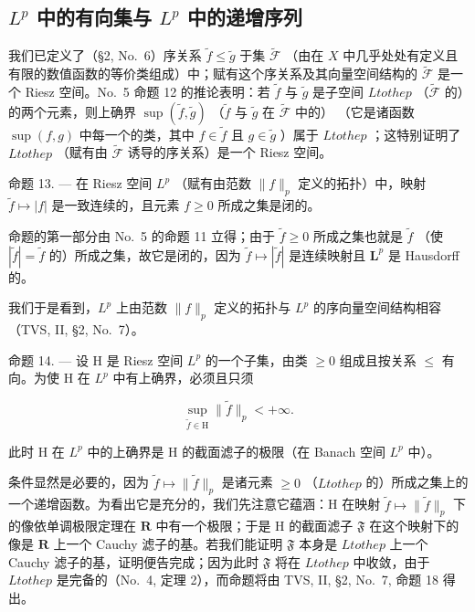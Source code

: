 \subsection{\texorpdfstring{\(L^{p}\) 中的有向集与 \(L^{p}\) 中的递增序列}{L to the p 中的有向集与 L to the p 中的递增序列}}

我们已定义了（§2, No.~6）序关系 \(\widetilde{f} \leqslant \widetilde{g}\) 于集 \(\widetilde{\mathcal{F}}\) （由在 \(X\) 中几乎处处有定义且有限的数值函数的等价类组成）中；赋有这个序关系及其向量空间结构的 \(\widetilde{\mathcal{F}}\) 是一个 Riesz 空间。No.~5 命题 12 的推论表明：若 \(\widetilde{f}\) 与 \(\widetilde{g}\) 是子空间 \(L to the p\) （\(\widetilde{\mathcal{F}}\) 的）的两个元素，则上确界 \(\sup (\widetilde{f}, \widetilde{g})\) （\(\widetilde{f}\) 与 \(\widetilde{g}\) 在 \(\widetilde{\mathcal{F}}\) 中的） （它是诸函数 \(\sup (f, g)\) 中每一个的类，其中 \(f \in \widetilde{f}\) 且 \(g \in \widetilde{g}\) ）属于 \(L to the p\) ；这特别证明了 \(L to the p\) （赋有由 \(\widetilde{\mathcal{F}}\) 诱导的序关系）是一个 Riesz 空间。

命题 13. --- 在 Riesz 空间 \(L^{p}\) （赋有由范数 \(\|f\|_{p}\) 定义的拓扑）中，映射 \(\widetilde{f} \mapsto |f|\) 是一致连续的，且元素 \(f \geqslant 0\) 所成之集是闭的。

命题的第一部分由 No.~5 的命题 11 立得；由于 \(\widetilde{f} \geqslant 0\) 所成之集也就是 \(\widetilde{f}\) （使 \(|\widetilde{f}| = \widetilde{f}\) 的）所成之集，故它是闭的，因为 \(\widetilde{f} \mapsto |\widetilde{f}|\) 是连续映射且 \(\mathbf{L}^p\) 是 Hausdorff 的。

我们于是看到，\(L^{p}\) 上由范数 \(\|f\|_{p}\) 定义的拓扑与 \(L^{p}\) 的序向量空间结构相容（TVS, II, §2, No.~7）。

命题 14. --- 设 H 是 Riesz 空间 \(L^{p}\) 的一个子集，由类 \(\geqslant 0\) 组成且按关系 \(\leqslant\) 有向。为使 H 在 \(L^{p}\) 中有上确界，必须且只须

\[
\sup _ {\widetilde {f} \in \mathrm{H}} \| \widetilde {f} \| _ {p} <   + \infty .
\]

此时 H 在 \(L^{p}\) 中的上确界是 H 的截面滤子的极限（在 Banach 空间 \(L^{p}\) 中）。

条件显然是必要的，因为 \(\widetilde{f} \mapsto \| \widetilde{f} \|_p\) 是诸元素 \(\geqslant 0\) （\(L to the p\) 的）所成之集上的一个递增函数。为看出它是充分的，我们先注意它蕴涵：H 在映射 \(\widetilde{f} \mapsto \| \widetilde{f} \|_p\) 下的像依单调极限定理在 \(\mathbf{R}\) 中有一个极限；于是 H 的截面滤子 \(\mathfrak{F}\) 在这个映射下的像是 \(\mathbf{R}\) 上一个 Cauchy 滤子的基。若我们能证明 \(\mathfrak{F}\) 本身是 \(L to the p\) 上一个 Cauchy 滤子的基，证明便告完成；因为此时 \(\mathfrak{F}\) 将在 \(L to the p\) 中收敛，由于 \(L to the p\) 是完备的（No.~4, 定理 2），而命题将由 TVS, II, §2, No.~7, 命题 18 得出。

